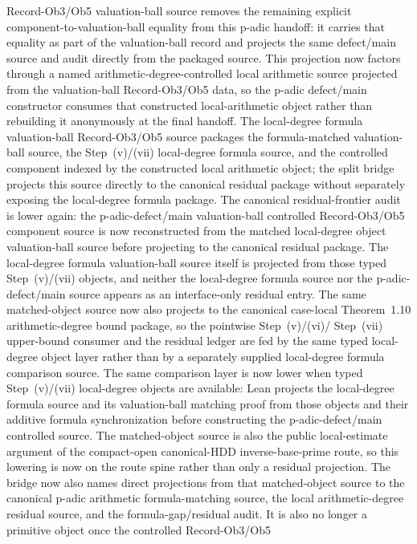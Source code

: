 \documentclass[11pt]{article}
\theoremstyle{plain}
\theoremstyle{definition}
\theoremstyle{remark}
\begin{document}
Record-Ob3/Ob5 valuation-ball source removes the remaining explicit
component-to-valuation-ball equality from this p-adic handoff: it carries that
equality as part of the valuation-ball record and projects the same
defect/main source and audit directly from the packaged source.  This
projection now factors through a named arithmetic-degree-controlled local
arithmetic source projected from the valuation-ball Record-Ob3/Ob5 data, so
the p-adic defect/main constructor consumes that constructed local-arithmetic
object rather than rebuilding it anonymously at the final handoff.  The
local-degree formula valuation-ball Record-Ob3/Ob5 source packages the
formula-matched valuation-ball source, the Step~(v)/(vii) local-degree formula
source, and the controlled component indexed by the constructed local
arithmetic object; the split bridge projects this source directly to the
canonical residual package without separately exposing the local-degree formula
package.  The canonical residual-frontier audit is lower again: the
p-adic-defect/main valuation-ball controlled Record-Ob3/Ob5 component source is
now reconstructed from the matched local-degree object valuation-ball source
before projecting to the canonical residual package.  The local-degree formula
valuation-ball source itself is projected from those typed Step~(v)/(vii)
objects, and neither the local-degree formula source nor the p-adic-defect/main
source appears as an interface-only residual entry.
The same matched-object source now also projects to the canonical case-local
Theorem~1.10 arithmetic-degree bound package, so the pointwise Step~(v)/(vi)/
Step~(vii) upper-bound consumer and the residual ledger are fed by the same
typed local-degree object layer rather than by a separately supplied
local-degree formula comparison source.
The same comparison layer is now lower when typed Step~(v)/(vii) local-degree
objects are available: Lean projects the local-degree formula source and its
valuation-ball matching proof from those objects and their additive formula
synchronization before constructing the p-adic-defect/main controlled source.
The matched-object source is also the public local-estimate argument of the
compact-open canonical-HDD inverse-base-prime route, so this lowering is now on
the route spine rather than only a residual projection.
The bridge now also names direct projections from that matched-object source to
the canonical p-adic arithmetic formula-matching source, the local
arithmetic-degree residual source, and the formula-gap/residual audit.
It is also no longer a primitive object once the controlled Record-Ob3/Ob5
\end{document}
